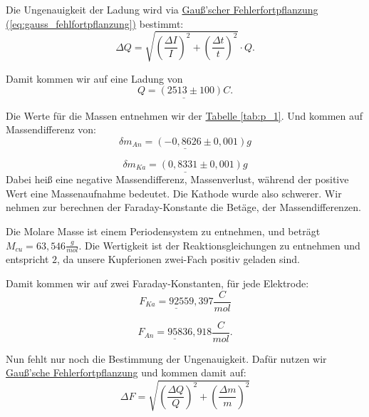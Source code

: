Die Ungenauigkeit der Ladung wird via \hyperref[eq:gauss_fehlfortpflanzung]{Gauß'scher Fehlerfortpflanzung (\ref*{eq:gauss_fehlfortpflanzung})} bestimmt:
\begin{equation}
    \Delta Q = \sqrt{\left( \frac{\Delta I}{I} \right)^2 + \left( \frac{\Delta t}{t} \right)^2} \cdot Q.
    \label{eq:f_q}
\end{equation}

Damit kommen wir auf eine Ladung von 
\begin{equation}
    \underline{Q = (2513 \pm 100)C}.
\end{equation}

Die Werte für die Massen entnehmen wir der \hyperref[tab:p_1]{Tabelle \ref*{tab:p_1}}. Und kommen auf Massendifferenz von:
\begin{equation}
    \underline{
        \delta m_{An} = (-0,8626 \pm 0,001) g
    }
\end{equation}

\begin{equation}
    \underline{
        \delta m_{Ka} = (0,8331 \pm 0,001) g
    }
\end{equation}
Dabei heiß eine negative Massendifferenz, Massenverlust, während der positive Wert eine Massenaufnahme bedeutet. Die Kathode wurde also schwerer. Wir nehmen zur berechnen der Faraday-Konstante die Betäge, der Massendifferenzen.

Die Molare Masse ist einem Periodensystem \cite{CuMol} zu entnehmen, und beträgt $M_{cu} = 63,546 \frac{g}{mol}$. Die Wertigkeit ist der Reaktionsgleichungen zu entnehmen und entspricht $2$, da unsere Kupferionen zwei-Fach positiv geladen sind.

Damit kommen wir auf zwei Faraday-Konstanten, für jede Elektrode:
\begin{equation}
    \underline{F_{Ka} = 92559,397} \frac{C}{mol}
\end{equation}

\begin{equation}
    \underline{F_{An} = 95836,918} \frac{C}{mol}.
\end{equation}

Nun fehlt nur noch die Bestimmung der Ungenauigkeit. Dafür nutzen wir \hyperref[eq:gauss_fehlfortpflanzung]{Gauß'sche Fehlerfortpflanzung} und kommen damit auf:
\begin{equation}
    \Delta F = \sqrt{\left(\frac{\Delta Q}{Q}\right)^2 + \left(\frac{\Delta m}{m}\right)^2}
\end{equation}

